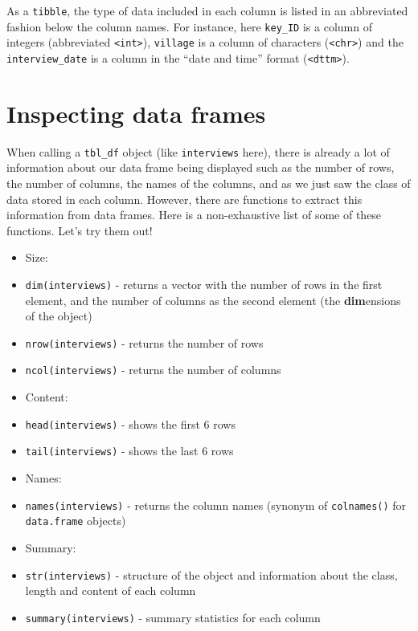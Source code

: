 \documentclass[]{book}
\begin{document}
As a \texttt{tibble}, the type of data included in each column is listed
in an abbreviated fashion below the column names. For instance, here
\texttt{key\_ID} is a column of integers (abbreviated
\texttt{\textless{}int\textgreater{}}), \texttt{village} is a column of
characters (\texttt{\textless{}chr\textgreater{}}) and the
\texttt{interview\_date} is a column in the ``date and time'' format
(\texttt{\textless{}dttm\textgreater{}}).

\section{Inspecting data frames}\label{inspecting-data-frames}

When calling a \texttt{tbl\_df} object (like \texttt{interviews} here),
there is already a lot of information about our data frame being
displayed such as the number of rows, the number of columns, the names
of the columns, and as we just saw the class of data stored in each
column. However, there are functions to extract this information from
data frames. Here is a non-exhaustive list of some of these functions.
Let's try them out!

\begin{itemize}
\item
  Size:
\item
  \texttt{dim(interviews)} - returns a vector with the number of rows in
  the first element, and the number of columns as the second element
  (the \textbf{dim}ensions of the object)
\item
  \texttt{nrow(interviews)} - returns the number of rows
\item
  \texttt{ncol(interviews)} - returns the number of columns
\item
  Content:
\item
  \texttt{head(interviews)} - shows the first 6 rows
\item
  \texttt{tail(interviews)} - shows the last 6 rows
\item
  Names:
\item
  \texttt{names(interviews)} - returns the column names (synonym of
  \texttt{colnames()} for \texttt{data.frame} objects)
\item
  Summary:
\item
  \texttt{str(interviews)} - structure of the object and information
  about the class, length and content of each column
\item
  \texttt{summary(interviews)} - summary statistics for each column
\end{itemize}
\end{document}

